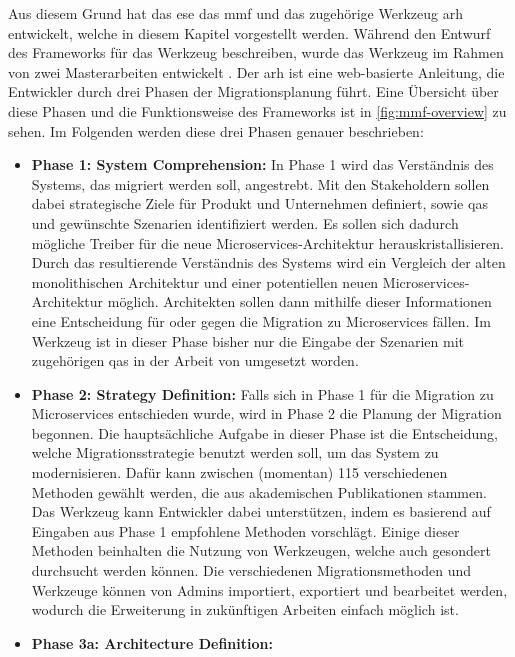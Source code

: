 Aus diesem Grund hat das \gls{ese} das \acrfull{mmf} und das zugehörige Werkzeug \gls{arh} \cite{arh-github} entwickelt, welche in diesem Kapitel vorgestellt werden.
Während  den Entwurf des Frameworks für das Werkzeug beschreiben, wurde das Werkzeug im Rahmen von zwei Masterarbeiten entwickelt \cite{master-daniel-koch}\cite{master-tobias-haller}.
Der \gls{arh} ist eine web-basierte Anleitung, die Entwickler durch drei Phasen der Migrationsplanung führt.
Eine Übersicht über diese Phasen und die Funktionsweise des Frameworks ist in \cref{fig:mmf-overview} zu sehen.
Im Folgenden werden diese drei Phasen genauer beschrieben:

\begin{itemize}
	\item \textbf{Phase 1: System Comprehension:}
	In Phase 1 wird das Verständnis des Systems, das migriert werden soll, angestrebt.
	Mit den Stakeholdern sollen dabei strategische Ziele für Produkt und Unternehmen definiert, sowie \glspl{qa} und gewünschte Szenarien identifiziert werden.
	Es sollen sich dadurch mögliche Treiber für die neue Microservices-Architektur herauskristallisieren.
	Durch das resultierende Verständnis des Systems wird ein Vergleich der alten monolithischen Architektur und einer potentiellen neuen Microservices-Architektur möglich.
	Architekten sollen dann mithilfe dieser Informationen eine Entscheidung für oder gegen die Migration zu Microservices fällen.
	Im Werkzeug ist in dieser Phase bisher nur die Eingabe der Szenarien mit zugehörigen \glspl{qa} in der Arbeit von  umgesetzt worden.
	\item \textbf{Phase 2: Strategy Definition:}
	Falls sich in Phase 1 für die Migration zu Microservices entschieden wurde, wird in Phase 2 die Planung der Migration begonnen.
	Die hauptsächliche Aufgabe in dieser Phase ist die Entscheidung, welche Migrationsstrategie benutzt werden soll, um das System zu modernisieren.
	Dafür kann zwischen (momentan) 115 verschiedenen Methoden gewählt werden, die aus akademischen Publikationen stammen.
	Das Werkzeug kann Entwickler dabei unterstützen, indem es basierend auf Eingaben aus Phase 1 empfohlene Methoden vorschlägt.
	Einige dieser Methoden beinhalten die Nutzung von Werkzeugen, welche auch gesondert durchsucht werden können.
	Die verschiedenen Migrationsmethoden und Werkzeuge können von Admins importiert, exportiert und bearbeitet werden, wodurch die Erweiterung in zukünftigen Arbeiten einfach möglich ist.
	\item \textbf{Phase 3a: Architecture Definition:}

\end{itemize}
